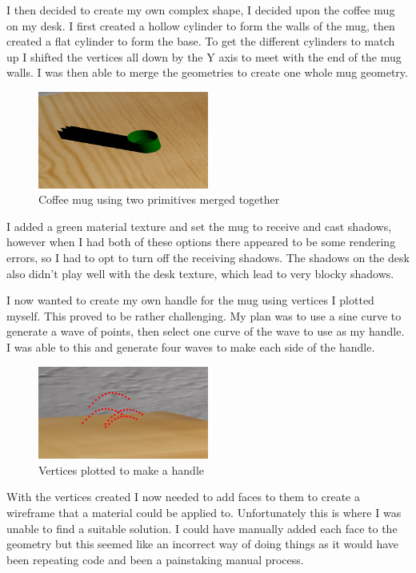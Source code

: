 \documentclass[runningheads,a4paper]{llncs}
\begin{document}
  I then decided to create my own complex shape, I decided upon the coffee mug on my desk. I first created a hollow cylinder to form the walls of the mug, then created a flat cylinder to form the base. To get the different cylinders to match up I shifted the vertices all down by the Y axis to meet with the end of the mug walls. I was then able to merge the geometries to create one whole mug geometry. 

  \begin{figure}[H]
    \centering
    \includegraphics[width=0.5\textwidth]{images/7.png}
    \caption{Coffee mug using two primitives merged together}
    \label{fig:window}
  \end{figure}


  I added a green material texture and set the mug to receive and cast shadows, however when I had both of these options there appeared to be some rendering errors, so I had to opt to turn off the receiving shadows. The shadows on the desk also didn't play well with the desk texture, which lead to very blocky shadows.

  I now wanted to create my own handle for the mug using vertices I plotted myself. This proved to be rather challenging. My plan was to use a sine curve to generate a wave of points, then select one curve of the wave to use as my handle. I was able to this and generate four waves to make each side of the handle.

  \begin{figure}[H]
    \centering
    \includegraphics[width=0.5\textwidth]{images/8.png}
    \caption{Vertices plotted to make a handle}
    \label{fig:window}
  \end{figure}

  With the vertices created I now needed to add faces to them to create a wireframe that a material could be applied to. Unfortunately this is where I was unable to find a suitable solution. I could have manually added each face to the geometry but this seemed like an incorrect way of doing things as it would have been repeating code and been a painstaking manual process. 
\end{document}
